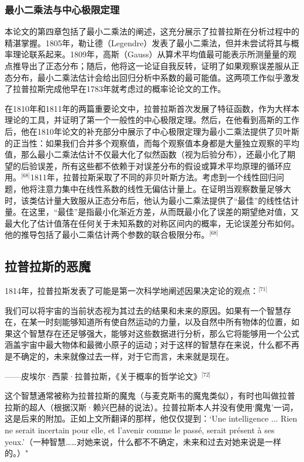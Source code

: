 \subsubsection{最小二乘法与中心极限定理}  
本论文的第四章包括了最小二乘法的阐述，这充分展示了拉普拉斯在分析过程中的精湛掌握。1805年，勒让德（Legendre）发表了最小二乘法，但并未尝试将其与概率理论联系起来。1809年，高斯（Gauss）从算术平均值最可能表示所测量量的观点推导出了正态分布；随后，他将这一论证自我反转，证明了如果观察误差服从正态分布，最小二乘法估计会给出回归分析中系数的最可能值。这两项工作似乎激发了拉普拉斯完成他早在1783年就考虑过的概率论论文的工作。

在1810年和1811年的两篇重要论文中，拉普拉斯首次发展了特征函数，作为大样本理论的工具，并证明了第一个一般性的中心极限定理。然后，在他看到高斯的工作后，他在1810年论文的补充部分中展示了中心极限定理为最小二乘法提供了贝叶斯的正当性：如果我们合并多个观察值，而每个观察值本身都是大量独立观察的平均值，那么最小二乘法估计不仅最大化了似然函数（视为后验分布），还最小化了期望的后验误差，所有这些都不依赖于对误差分布的假设或算术平均原理的循环应用。\(^\text{[68]}\)1811年，拉普拉斯采取了不同的非贝叶斯方法。考虑到一个线性回归问题，他将注意力集中在线性系数的线性无偏估计量上。在证明当观察数量足够大时，该类估计量大致服从正态分布后，他认为最小二乘法提供了“最佳”的线性估计量。在这里，“最佳”是指最小化渐近方差，从而既最小化了误差的期望绝对值，又最大化了估计值落在任何关于未知系数的对称区间内的概率，无论误差分布如何。他的推导包括了最小二乘估计两个参数的联合极限分布。\(^\text{[68]}\)
\subsection{拉普拉斯的恶魔}  
1814年，拉普拉斯发表了可能是第一次科学地阐述因果决定论的观点：\(^\text{[71]}\)

我们可以将宇宙的当前状态视为其过去的结果和未来的原因。如果有一个智慧存在，在某一时刻能够知道所有使自然运动的力量，以及自然中所有物体的位置，如果这个智慧存在还足够强大，能够对这些数据进行分析，那么它将能够用一个公式涵盖宇宙中最大物体和最微小原子的运动；对于这样的智慧存在来说，什么都不再是不确定的，未来就像过去一样，对于它而言，未来就是现在。  

——皮埃尔·西蒙·拉普拉斯，《关于概率的哲学论文》\(^\text{[72]}\)

这个智慧通常被称为拉普拉斯的魔鬼（与麦克斯韦的魔鬼类似），有时也叫做拉普拉斯的超人（根据汉斯·赖兴巴赫的说法）。拉普拉斯本人并没有使用‘魔鬼’一词，这是后来的附加。正如上文所翻译的那样，他仅仅提到：‘Une intelligence ... Rien ne serait incertain pour elle, et l’avenir comme le passé, serait présent à ses yeux.’（一种智慧……对她来说，什么都不不确定，未来和过去对她来说是一样的。）"

